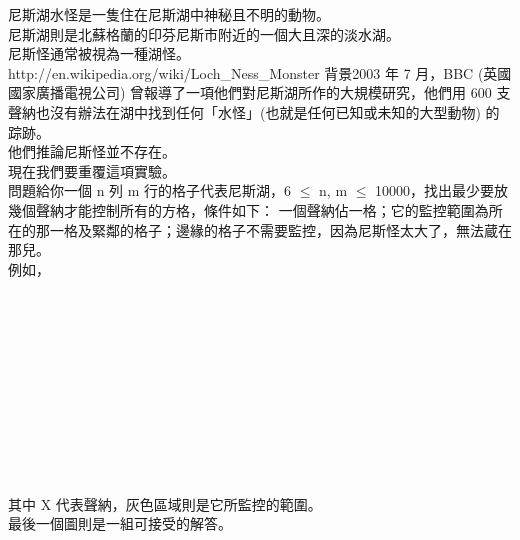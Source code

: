 尼斯湖水怪是一隻住在尼斯湖中神秘且不明的動物。\\
尼斯湖則是北蘇格蘭的印芬尼斯市附近的一個大且深的淡水湖。\\
尼斯怪通常被視為一種湖怪。\\
http://en.wikipedia.org/wiki/Loch_Ness_Monster 背景2003 年 7 月，BBC (英國國家廣播電視公司) 曾報導了一項他們對尼斯湖所作的大規模研究，他們用 600 支聲納也沒有辦法在湖中找到任何「水怪」(也就是任何已知或未知的大型動物) 的踪跡。\\
他們推論尼斯怪並不存在。\\
現在我們要重覆這項實驗。\\
問題給你一個 n 列 m 行的格子代表尼斯湖，6 $\leq$ n, m $\leq$ 10000，找出最少要放幾個聲納才能控制所有的方格，條件如下： 一個聲納佔一格；它的監控範圍為所在的那一格及緊鄰的格子；邊緣的格子不需要監控，因為尼斯怪太大了，無法蔵在那兒。\\
例如，\\
 \\
 \\
 \\
 \\
 \\
\\
 \\
 \\
\\
 \\
\\
其中 X 代表聲納，灰色區域則是它所監控的範圍。\\
最後一個圖則是一組可接受的解答。\\
